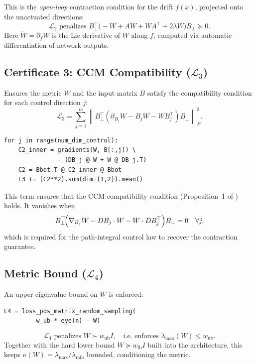 \documentclass[11pt,a4paper]{article}
\begin{document}
\begin{codemath}
This is the \emph{open-loop} contraction condition for the drift \(f(x)\), projected onto the unactuated directions:
\[
\mathcal{L}_2 \text{ penalizes } B_{\bot}^\top\!\bigl(-\dot W + A W + W A^\top + 2\lambda W\bigr)B_{\bot} \succeq 0.
\]
Here \(\dot W = \partial_f W\) is the Lie derivative of \(W\) along \(f\), computed via automatic differentiation of network outputs.
\end{codemath}

\subsection{Certificate 3: CCM Compatibility (\texorpdfstring{$\mathcal{L}_3$}{L3})}

Ensures the metric \(W\) and the input matrix \(B\) satisfy the compatibility condition for each control direction \(j\):
\[
\mathcal{L}_3 = \sum_{j=1}^{m} \left\| B_{\bot}^\top \!\left( \partial_{B_j} W - B_j W - W B_j^\top \right) B_{\bot} \right\|_F^2.
\]

\begin{lstlisting}[style=python]
for j in range(num_dim_control):
    C2_inner = gradients(W, B[:,j]) \
               - (DB_j @ W + W @ DB_j.T)
    C2 = Bbot.T @ C2_inner @ Bbot
    L3 += (C2**2).sum(dim=(1,2)).mean()
\end{lstlisting}

\begin{codemath}
This term ensures that the CCM compatibility condition (Proposition~1 of \cite{sun2020c3m}) holds. It vanishes when
\[
B_{\bot}^\top\!\Bigl(\nabla_{B_j} W - D B_j \cdot W - W \cdot D B_j^\top\Bigr)B_{\bot} = 0 \quad \forall j,
\]
which is required for the path-integral control law to recover the contraction guarantee.
\end{codemath}

\subsection{Metric Bound (\texorpdfstring{$\mathcal{L}_4$}{L4})}

An upper eigenvalue bound on \(W\) is enforced:
\begin{lstlisting}[style=python]
L4 = loss_pos_matrix_random_sampling(
         w_ub * eye(n) - W)
\end{lstlisting}

\begin{codemath}
\[
\mathcal{L}_4 \text{ penalizes } W \succ w_{\mathrm{ub}} I, \quad \text{i.e.\ enforces } \lambda_{\max}(W) \le w_{\mathrm{ub}}.
\]
Together with the hard lower bound \(W \succeq w_{\mathrm{lb}} I\) built into the architecture, this keeps \(\kappa(W) = \lambda_{\max}/\lambda_{\min}\) bounded, conditioning the metric.
\end{codemath}
\end{document}
